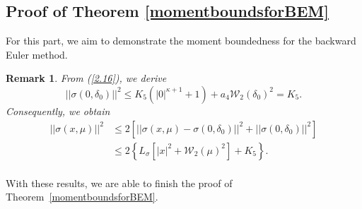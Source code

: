\documentclass[12pt]{article}
\numberwithin{equation}{section}
\newtheorem{remark}[assumption]{Remark}
\begin{document}
\subsection{Proof of Theorem \ref{momentboundsforBEM}}
For this part, we aim to demonstrate the moment boundedness for the backward Euler method.
\begin{remark}
    From (\ref{2.16}), we derive
    \begin{equation}\tag{5.108}\label{6.3}
    \left|\left|\sigma \left( 0,\delta _0 \right) \right|\right|^2\leq K_5\left( \left|0\right|^{\kappa +1}+1 \right) +a_4\mathcal{W} _2\left( \delta _0 \right) ^2 = K_5.
    \end{equation}
     Consequently, we obtain
\begin{equation}\tag{5.109}\label{6.4}
\begin{aligned}
\left|\left|\sigma \left( x,\mu \right) \right|\right|^2
&\leq 2\left[ \left|\left|\sigma \left( x,\mu \right) -\sigma \left( 0,\delta _0 \right) \right|\right|^2+\left|\left|\sigma \left( 0,\delta _0 \right) \right|\right|^2 \right] \\
&\leq 2\left\{ L_{\sigma}\left[ \left|x\right|^2+\mathcal{W} _2\left( \mu \right) ^2 \right] +K_5 \right\}.\\
\end{aligned}
\end{equation}
\end{remark}
 With these results, we are able to finish the proof of Theorem~\ref{momentboundsforBEM}.
\end{document}
